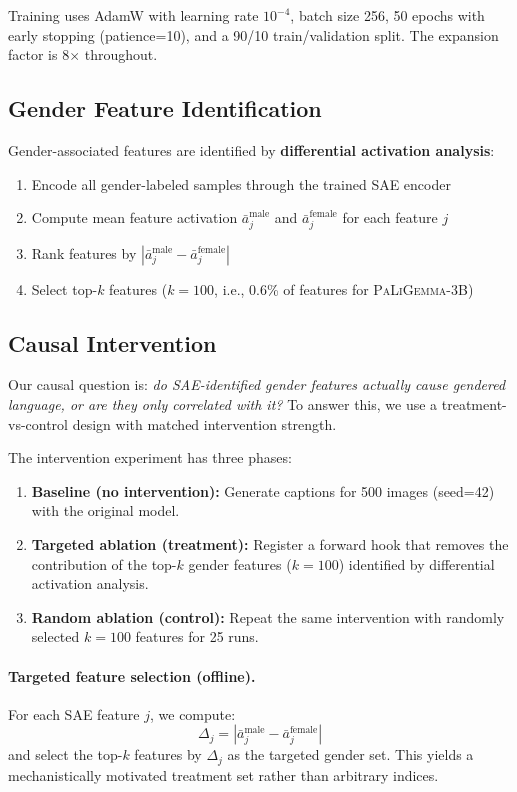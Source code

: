 \documentclass[11pt,a4paper]{article}
\newcommand{\modelname}[1]{\textsc{#1}}
\newcommand{\pali}{\modelname{PaLiGemma-3B}}
\newcommand{\sae}{SAE}
\begin{document}
Training uses AdamW with learning rate $10^{-4}$, batch size 256, 50 epochs with early stopping (patience=10), and a 90/10 train/validation split.
The expansion factor is 8$\times$ throughout.

\subsection{Gender Feature Identification}
\label{sec:feature_id}

Gender-associated features are identified by \textbf{differential activation analysis}:
\begin{enumerate}
    \item Encode all gender-labeled samples through the trained \sae{} encoder
    \item Compute mean feature activation $\bar{a}_j^{\text{male}}$ and $\bar{a}_j^{\text{female}}$ for each feature $j$
    \item Rank features by $|\bar{a}_j^{\text{male}} - \bar{a}_j^{\text{female}}|$
    \item Select top-$k$ features ($k=100$, i.e., 0.6\% of features for \pali{})
\end{enumerate}

\subsection{Causal Intervention}
\label{sec:intervention}

Our causal question is: \emph{do SAE-identified gender features actually cause gendered language, or are they only correlated with it?}
To answer this, we use a treatment-vs-control design with matched intervention strength.

The intervention experiment has three phases:

\begin{enumerate}
    \item \textbf{Baseline (no intervention):} Generate captions for 500 images (seed=42) with the original model.
    \item \textbf{Targeted ablation (treatment):} Register a forward hook that removes the contribution of the top-$k$ gender features ($k=100$) identified by differential activation analysis.
    \item \textbf{Random ablation (control):} Repeat the same intervention with randomly selected $k=100$ features for 25 runs.
\end{enumerate}

\paragraph{Targeted feature selection (offline).}
For each SAE feature $j$, we compute:
\begin{equation}
\Delta_j = |\bar{a}_j^{\text{male}} - \bar{a}_j^{\text{female}}|
\end{equation}
and select the top-$k$ features by $\Delta_j$ as the targeted gender set.
This yields a mechanistically motivated treatment set rather than arbitrary indices.
\end{document}
